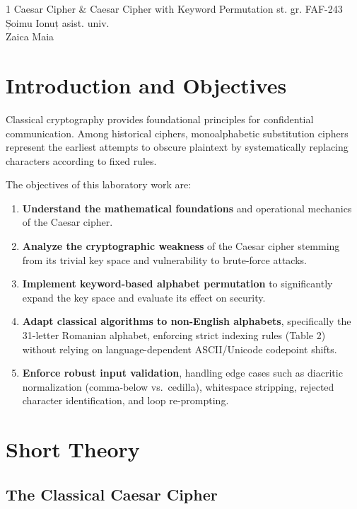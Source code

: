 \documentclass{labreport}
\begin{document}
\labtitle
    {1}
    {Caesar Cipher \& Caesar Cipher with Keyword Permutation}
    {st. gr. FAF-243}
    {Șoimu Ionuț}
    {asist. univ.\\[0.15cm] Zaica Maia}

\tableofcontents
\newpage

\section{Introduction and Objectives}

Classical cryptography provides foundational principles for confidential communication. Among historical ciphers, monoalphabetic substitution ciphers represent the earliest attempts to obscure plaintext by systematically replacing characters according to fixed rules.

The objectives of this laboratory work are:
\begin{enumerate}[leftmargin=*]
    \item \textbf{Understand the mathematical foundations} and operational mechanics of the Caesar cipher.
    \item \textbf{Analyze the cryptographic weakness} of the Caesar cipher stemming from its trivial key space and vulnerability to brute-force attacks.
    \item \textbf{Implement keyword-based alphabet permutation} to significantly expand the key space and evaluate its effect on security.
    \item \textbf{Adapt classical algorithms to non-English alphabets}, specifically the 31-letter Romanian alphabet, enforcing strict indexing rules (Table 2) without relying on language-dependent ASCII/Unicode codepoint shifts.
    \item \textbf{Enforce robust input validation}, handling edge cases such as diacritic normalization (comma-below vs.\ cedilla), whitespace stripping, rejected character identification, and loop re-prompting.
\end{enumerate}

\section{Short Theory}

\subsection{The Classical Caesar Cipher}
\end{document}
